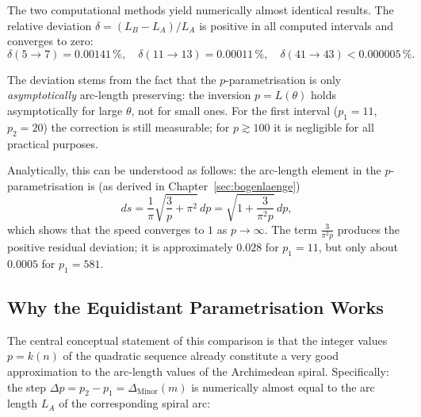 \begin{proposition}
\label{prop:methoden_uebereinstimmung}
The two computational methods yield numerically almost identical results.
The relative deviation $\delta = (L_B - L_A)/L_A$ is positive in all computed intervals and converges to zero:
\[
\delta(5 \to 7) = 0.00141\,\%,\quad
\delta(11 \to 13) = 0.00011\,\%,\quad
\delta(41 \to 43) < 0.000005\,\%.
\]
\end{proposition}

\begin{remark}
The deviation stems from the fact that the $p$-parametrisation is only
\emph{asymptotically} arc-length preserving: the inversion $p = L(\theta)$
holds asymptotically for large $\theta$, not for small ones. For the first interval
($p_1 = 11$, $p_2 = 20$) the correction is still measurable; for
$p \gtrsim 100$ it is negligible for all practical purposes.

Analytically, this can be understood as follows: the arc-length element in the
$p$-parametrisation is (as derived in Chapter~\ref{sec:bogenlaenge})
\[
ds = \frac{1}{\pi}\sqrt{\frac{3}{p}+\pi^2}\,dp
   = \sqrt{1 + \frac{3}{\pi^2 p}}\,dp,
\]
which shows that the speed converges to $1$ as $p \to \infty$.
The term $\frac{3}{\pi^2 p}$ produces the positive residual deviation; it is
approximately $0.028$ for $p_1 = 11$, but only about $0.0005$ for $p_1 = 581$.
\end{remark}

\subsection{Why the Equidistant Parametrisation Works}

The central conceptual statement of this comparison is that the
integer values $p = k(n)$ of the quadratic sequence already constitute
a very good approximation to the arc-length values of the Archimedean
spiral. Specifically: the step $\Delta p = p_2 - p_1 = \Delta_{\mathrm{Minor}}(m)$
is numerically almost equal to the arc length $L_A$ of the corresponding
spiral arc:

